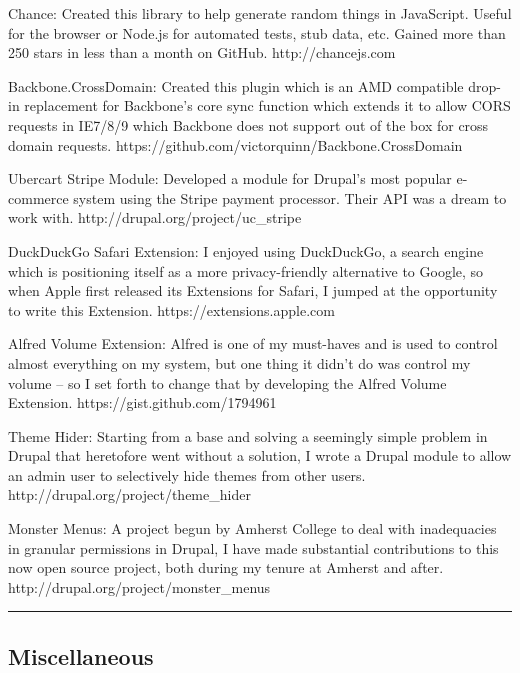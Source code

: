 \documentclass[10pt,letterpaper]{article}
\newenvironment{indentsection}[1]%
{\begin{list}{}%
	{\setlength{\leftmargin}{#1}}%
	\item[]%
}
{\end{list}}
\begin{document}
\begin{indentsection}{\parindent}
\begin{description*}
	\item[Chance:]
	Created this library to help generate random things in JavaScript. Useful for the browser or Node.js for automated tests, stub data, etc. Gained more than 250 stars in less than a month on GitHub. http://chancejs.com
	\item[Backbone.CrossDomain:]
         Created this plugin which is an AMD compatible drop-in replacement for Backbone's core sync function which extends it to allow CORS requests in IE7/8/9 which Backbone does not support out of the box for cross domain requests. https://github.com/victorquinn/Backbone.CrossDomain
	\item[Ubercart Stripe Module:]
	 Developed a module for Drupal's most popular e-commerce system using the Stripe payment processor. Their API was a dream to work with. http://drupal.org/project/uc\_stripe
	\item[DuckDuckGo Safari Extension:]
	I enjoyed using DuckDuckGo, a search engine which is positioning itself as a more privacy-friendly alternative to Google, so when Apple first released its Extensions for Safari, I jumped at the opportunity to write this Extension.  https://extensions.apple.com
	\item[Alfred Volume Extension:]
	Alfred is one of my must-haves and is used to control almost everything on my system, but one thing it didn't do was control my volume -- so I set forth to change that by developing the Alfred Volume Extension. https://gist.github.com/1794961
	\item[Theme Hider:]
	Starting from a base and solving a seemingly simple problem in Drupal that heretofore went without a solution, I wrote a Drupal module to allow an admin user to selectively hide themes from other users. http://drupal.org/project/theme\_hider
	\item[Monster Menus:]
	A project begun by Amherst College to deal with inadequacies in granular permissions in Drupal, I have made substantial contributions to this now open source project, both during my tenure at Amherst and after. http://drupal.org/project/monster\_menus
\end{description*}
\end{indentsection}

\begin{center}
\hrule
\vspace{-0.4em}
\subsection*{Miscellaneous}
\end{center}
\end{document}
